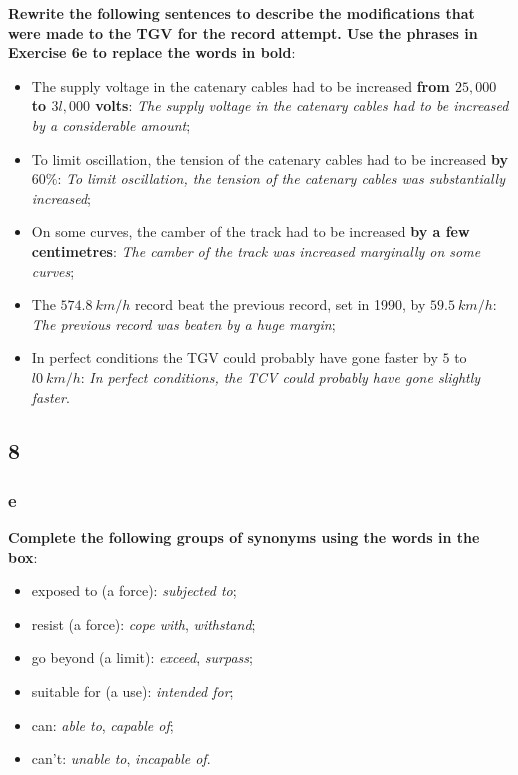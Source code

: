 \textbf{Rewrite the following sentences to describe the modifications that were made to the TGV for the record attempt. Use the phrases in Exercise 6e to replace the words in bold}:

\begin{itemize}

\item The supply voltage in the catenary cables had to be increased \textbf{from $25,000$ to $3l,000$ volts}: \textit{The supply voltage in the catenary cables had to be increased by a considerable amount};
\item To limit oscillation, the tension of the catenary cables had to be increased \textbf{by $60\%$}: \textit{To limit oscillation, the tension of the catenary cables was substantially increased};
\item On some curves, the camber of the track had to be increased \textbf{by a few centimetres}: \textit{The camber of the track was increased marginally on some curves};
\item The $574.8\ km/h$ record beat the previous record, set in 1990, by $59.5\ km/h$: \textit{The previous record was beaten by a huge margin};
\item In perfect conditions the TGV could probably have gone faster by $5$ to $l0\ km/h$: \textit{In perfect conditions, the TCV could probably have gone slightly faster}.

\end{itemize}

\subsection{8}

\subsubsection{e}

\textbf{Complete the following groups of synonyms using the words in the box}:

\begin{itemize}

\item exposed to (a force): \textit{subjected to};
\item resist (a force): \textit{cope with}, \textit{withstand};
\item go beyond (a limit): \textit{exceed}, \textit{surpass};
\item suitable for (a use): \textit{intended for};
\item can: \textit{able to}, \textit{capable of};
\item can't: \textit{unable to}, \textit{incapable of}.

\end{itemize}

